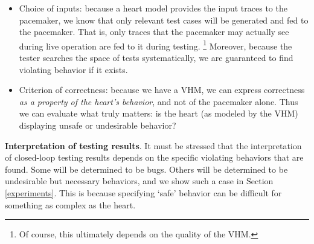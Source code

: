 \begin{itemize}
	\item Choice of inputs: because a heart model provides the input traces to the pacemaker, we know that only relevant test cases will be generated and fed to the pacemaker. 
	That is, only traces that the pacemaker may actually see during live operation are fed to it during testing. 
	\footnote{Of course, this ultimately depends on the quality of the VHM.}
	Moreover, because the tester searches the space of tests systematically, we are guaranteed to find violating behavior if it exists.
	\item Criterion of correctness: because we have a VHM, we can express correctness \emph{as a property of the heart's behavior}, and not of the pacemaker alone. 
	Thus we can evaluate what truly matters: is the heart (as modeled by the VHM) displaying unsafe or undesirable behavior?
\end{itemize}



\textbf{Interpretation of testing results}.
It must be stressed that the interpretation of closed-loop testing results depends on the specific violating behaviors that are found.
Some will be determined to be bugs. 
Others will be determined to be undesirable but necessary behaviors, and we show such a case in Section \ref{experiments}.
This is because specifying `safe' behavior can be difficult for something as complex as the heart.
